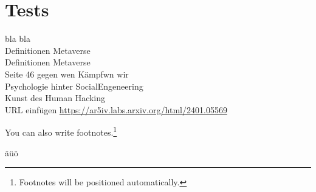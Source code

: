 

%


\section*{Tests}

bla bla \cite{test1}\\
Definitionen Metaverse \cite{Ball22}
\\Definitionen Metaverse \cite{Drip22} \\
Seite 46 gegen wen Kämpfwn wir \cite{Hypp22}\\
Psychologie hinter SocialEngeneering \cite{schu11}\\
Kunst des Human Hacking \cite{Hadn11}
\\

URL einfügen \url{https://ar5iv.labs.arxiv.org/html/2401.05569}


You can also write footnotes.\footnote{Footnotes will be positioned automatically.}

äüö
